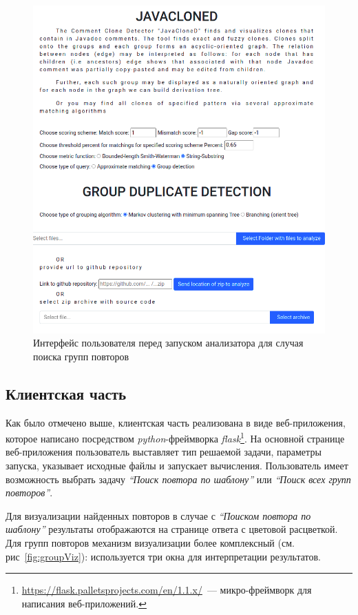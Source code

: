 \begin{figure}[h!]
    \centering
    \includegraphics[width=\columnwidth]{Mishin/figures/startApp.png}
    \caption{Интерфейс пользователя перед запуском анализатора для случая поиска групп повторов}\label{fig:startApp}
\end{figure}

\subsection{Клиентская часть}\label{clinet}
Как было отмечено выше, клиентская часть реализована в виде веб-приложения, которое написано посредством \emph{python}-фреймворка \emph{flask}\footnote{\url{https://flask.palletsprojects.com/en/1.1.x/}~--- микро-фрейм\-ворк для написания веб-приложений.}.
На основной странице веб-приложения пользователь выставляет тип решаемой задачи, параметры запуска, указывает исходные файлы и запускает вычисления.
Пользователь имеет возможность выбрать задачу \emph{``Поиск повтора по шаблону''} или \emph{``Поиск всех групп повторов''}.

Для визуализации найденных повторов в случае с  \emph{``Поиском повтора по шаблону''} результаты отображаются на странице ответа с цветовой расцветкой.
Для групп повторов механизм визуализации более комплексный (см. рис~\ref{fig:groupViz}): используется три окна для интерпретации результатов.

